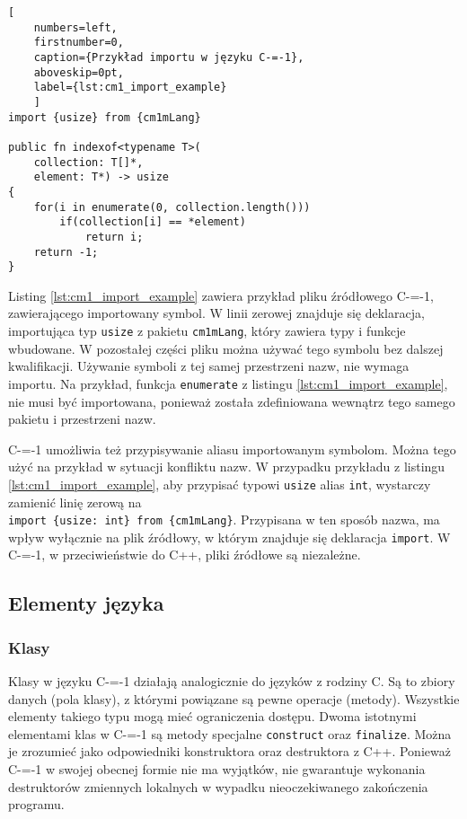 \begin{lstlisting}[
	numbers=left,
	firstnumber=0,
	caption={Przykład importu w języku C-=-1},
	aboveskip=0pt,
	label={lst:cm1_import_example}
	]
import {usize} from {cm1mLang}

public fn indexof<typename T>(
	collection: T[]*,
	element: T*) -> usize
{
	for(i in enumerate(0, collection.length()))
		if(collection[i] == *element)
			return i;
	return -1;
}
\end{lstlisting}

Listing \ref{lst:cm1_import_example} zawiera przykład pliku źródłowego C-=-1, zawierającego importowany symbol.
W linii zerowej znajduje się deklaracja, importująca typ \lstinline{usize} z pakietu \lstinline{cm1mLang}, który zawiera typy i funkcje wbudowane.
W pozostałej części pliku można używać tego symbolu bez dalszej kwalifikacji.
Używanie symboli z tej samej przestrzeni nazw, nie wymaga importu.
Na przykład, funkcja \lstinline{enumerate} z listingu \ref{lst:cm1_import_example}, nie musi być importowana, ponieważ została zdefiniowana wewnątrz tego samego pakietu i przestrzeni nazw.

C-=-1 umożliwia też przypisywanie aliasu importowanym symbolom.
Można tego użyć na przykład w sytuacji konfliktu nazw.
W przypadku przykładu z listingu \ref{lst:cm1_import_example}, aby przypisać typowi \lstinline{usize} alias \lstinline{int}, wystarczy zamienić linię zerową na\\ \lstinline|import {usize: int} from {cm1mLang}|.
Przypisana w ten sposób nazwa, ma wpływ wyłącznie na plik źródłowy, w którym znajduje się deklaracja \lstinline{import}.
W C-=-1, w przeciwieństwie do C++, pliki źródłowe są niezależne.

\subsection{Elementy języka}
\label{elementy_jezyka}

\subsubsection{Klasy}
\label{classes_definition}
Klasy w języku C-=-1 działają analogicznie do języków z rodziny C.
Są to zbiory danych (pola klasy), z którymi powiązane są pewne operacje (metody).
Wszystkie elementy takiego typu mogą mieć ograniczenia dostępu.
Dwoma istotnymi elementami klas w C-=-1 są metody specjalne \lstinline{construct} oraz \lstinline{finalize}.
Można je zrozumieć jako odpowiedniki konstruktora oraz destruktora z C++.
Ponieważ C-=-1 w swojej obecnej formie nie ma wyjątków, nie gwarantuje wykonania destruktorów zmiennych lokalnych w wypadku nieoczekiwanego zakończenia programu.

